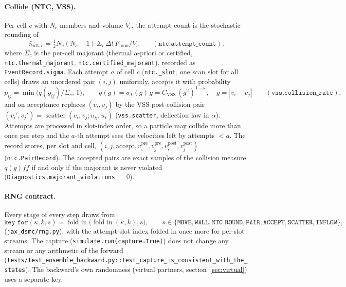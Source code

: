 \documentclass[11pt,a4paper]{article}
\numberwithin{equation}{section}
\newcommand{\code}[1]{\texttt{#1}}
\newcommand{\pth}{\mathrm{post}}
\newcommand{\pre}{\mathrm{pre}}
\begin{document}
\paragraph{Collide (NTC, VSS).}
Per cell $c$ with $N_c$ members and volume $V_c$, the attempt count is the
stochastic rounding of
\begin{equation}
\label{eq:attempts}
\bar n_{\mathrm{att},c} = \tfrac12 N_c (N_c - 1)\, \Sigma_c\, \Delta t\, F_{\mathrm{num}} / V_c
\qquad (\code{ntc.attempt\_count}),
\end{equation}
where $\Sigma_c$ is the per-cell majorant (thermal a-priori or certified,
\code{ntc.thermal\_majorant}, \code{ntc.certified\_majorant}), recorded as
\code{EventRecord.sigma}.  Each attempt $a$ of cell $c$ (\code{ntc.\_slot}, one scan
slot for all cells) draws an unordered pair $(i,j)$ uniformly, accepts it with probability
\begin{equation}
\label{eq:accept}
p_{ij} = \min\!\big(q(g_{ij})/\Sigma_c,\, 1\big),
\qquad
q(g) = \sigma_T(g)\, g = C_{\mathrm{VSS}}\, (g^2)^{1-\omega},\quad g = |v_i - v_j|
\qquad (\code{vss.collision\_rate}),
\end{equation}
and on acceptance replaces $(v_i, v_j)$ by the VSS post-collision pair
$(v_i', v_j') = \operatorname{scatter}(v_i, v_j; u_\chi, u_\epsilon)$
(\code{vss.scatter}, deflection law in $\alpha$).  Attempts are processed in
slot-index order, so a particle may collide more than once per step and the
$a$-th attempt sees the velocities left by attempts $< a$.  The record stores, per
slot and cell, $(i, j, \text{accept}, v_i^{\pre}, v_j^{\pre}, v_i^{\pth}, v_j^{\pth})$
(\code{ntc.PairRecord}).  The accepted pairs are exact samples of the collision
measure $q(g) f f$ if and only if the majorant is never violated
(\code{Diagnostics.majorant\_violations} $= 0$).

\paragraph{RNG contract.}
Every stage of every step draws from
\begin{equation}
\label{eq:key-for}
\code{key\_for}(\kappa, k, s) = \operatorname{fold\_in}\big(\operatorname{fold\_in}(\kappa, k), s\big),
\qquad s \in \{\code{MOVE}, \code{WALL}, \code{NTC\_ROUND}, \code{PAIR}, \code{ACCEPT}, \code{SCATTER}, \code{INFLOW}\},
\end{equation}
(\code{jax\_dsmc/rng.py}), with the attempt-slot index folded in once more for
per-slot streams.  The capture (\code{simulate.run(capture=True)}) does not change any
stream or any arithmetic of the forward
(\code{tests/test\_ensemble\_backward.py::test\_capture\_is\_consistent\_with\_the\_states}).
The backward's own randomness (virtual partners, section~\ref{sec:virtual}) uses a
separate key.
\end{document}
